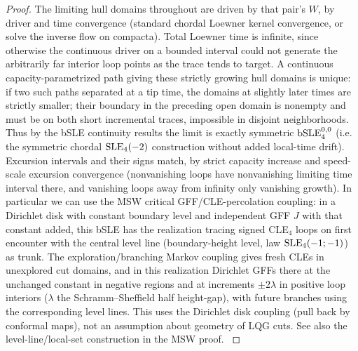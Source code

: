 \begin{proof}
The limiting hull domains throughout are driven by that pair's \(W\), by driver and time convergence (standard chordal Loewner kernel convergence, or solve the inverse flow on compacta).
Total Loewner time is infinite, since otherwise the continuous driver on a bounded interval could not generate the arbitrarily far interior loop points as the trace tends to target. A continuous capacity-parametrized path giving these strictly growing hull domains is unique: if two such paths separated at a tip time, the domains at slightly later times are strictly smaller; their boundary in the preceding open domain is nonempty and must be on both short incremental traces, impossible in disjoint neighborhoods.
Thus by the bSLE continuity results the limit is exactly symmetric \({\rm bSLE}^{0,0}_4\) (i.e. the symmetric chordal \({\rm SLE}_4(-2)\) construction without added local-time drift).
Excursion intervals and their signs match, by strict capacity increase and speed-scale excursion convergence (nonvanishing loops have nonvanishing limiting time interval there, and vanishing loops away from infinity only vanishing growth).
In particular we can use the MSW critical GFF/CLE-percolation coupling: in a Dirichlet disk with constant boundary level and independent GFF \(J\) with that constant added, this bSLE has the realization tracing signed CLE\(_4\) loops on first encounter with the central level line (boundary-height level, law \({\rm SLE}_4(-1;-1)\)) as trunk.
The exploration/branching Markov coupling gives fresh CLEs in unexplored cut domains, and in this realization Dirichlet GFFs there at the unchanged constant in negative regions and at increments \(\pm2\lambda\) in positive loop interiors (\(\lambda\) the Schramm--Sheffield half height-gap), with future branches using the corresponding level lines.
This uses the Dirichlet disk coupling (pull back by conformal maps), not an assumption about geometry of LQG cuts.
See also the level-line/local-set construction in the MSW proof. \citep[Proposition~5.3]{MSWTrunk}


\end{proof}
